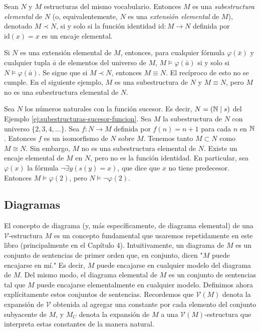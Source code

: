 \message{ !name(main.tex)}\documentclass[12pt,a4paper]{book}
\newcommand{\comillas}[1]{"#1"}
\newcommand{\VV}{\mathcal{V}}
\begin{document}
    \begin{definicion}\label{def:subestructura-elemental}
        Sean $N$ y $M$ estructuras del mismo vocabulario. Entonces $M$ es una \textit{subestructura elemental} de $N$ (o,
        equivalentemente, $N$ es una \textit{extensión elemental} de $M$), denotado $M\prec N$, si y solo si la función
        identidad $\mathrm{id}:M\rightarrow N$ definida por $\mathrm{id}(x)=x$ es un encaje elemental.
    \end{definicion}

    Si $N$ es una extensión elemental de $M$, entonces, para cualquier fórmula $\varphi(\bar{x})$ y cualquier tupla
    $\bar{a}$ de elementos del universo de $M$, $M\models\varphi(\bar{a})$ si y solo si $N\models\varphi(\bar{a})$. Se
    sigue que si $M\prec N$, entonces $M\equiv N$. El recíproco de esto no se cumple. En el siguiente ejemplo, $M$ es una
    subestructura de $N$ y $M\equiv N$, pero $M$ no es una subestructura elemental de $N$.

    \begin{ejemplo}\label{ej:subestructura-no-elemental}
        Sea $N$ los números naturales con la función sucesor. Es decir, $N=(\mathbb{N}\mid s)$ del Ejemplo
        \ref{ej:subestructuras-sucesor-funcion}. Sea $M$ la subestructura de $N$ con universo $\{2,3,4,\dots\}$. Sea
        $f:N\rightarrow M$ definida por $f(n)=n+1$ para cada $n$ en $\mathbb{N}$. Entonces $f$ es un isomorfismo de $N$ sobre $M$.
        Tenemos tanto $M\subset N$ como $M\cong N$. Sin embargo, $M$ no es una subestructura elemental de $N$. Existe un
        encaje elemental de $M$ en $N$, pero no es la función identidad. En particular, sea $\varphi(x)$ la fórmula
        $\neg\exists y(s(y)=x)$, que dice que $x$ no tiene predecesor. Entonces $M\models\varphi(2)$, pero
        $N\models\neg\varphi(2)$.
    \end{ejemplo}

    \subsection{Diagramas}

    El concepto de diagrama (y, más específicamente, de diagrama elemental) de una $\VV$-estructura $M$ es un concepto
    fundamental que usaremos repetidamente en este libro (principalmente en el Capítulo 4). Intuitivamente, un diagrama de
    $M$ es un conjunto de sentencias de primer orden que, en conjunto, dicen \comillas{$M$ puede encajarse en mí.} Es
    decir, $M$ puede encajarse en cualquier modelo del diagrama de $M$. Del mismo modo, el diagrama elemental de $M$ es un
    conjunto de sentencias tal que $M$ puede encajarse elementalmente en cualquier modelo. Definimos ahora explícitamente
    estos conjuntos de sentencias. Recordemos que $\VV(M)$ denota la expansión de $\VV$ obtenida al agregar una constante
    por cada elemento del conjunto subyacente de $M$, y $M_{C}$ denota la expansión de $M$ a una $\VV(M)$-estructura que
    interpreta estas constantes de la manera natural.
\end{document}
